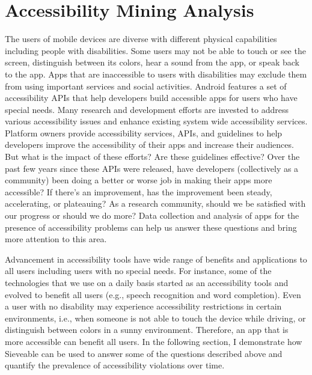 \section{Accessibility Mining Analysis}
The users of mobile devices are diverse with different physical capabilities including people with disabilities.
Some users may not be able to touch or see the screen, distinguish between its colors, hear a sound from the app, or speak back to the app.
Apps that are inaccessible to users with disabilities may exclude them from using important services and social activities.
Android features a set of accessibility APIs that help developers build accessible apps for users who have special needs.
Many research and development efforts are invested to address various accessibility issues and enhance existing system wide accessibility services.
Platform owners provide accessibility services, APIs, and guidelines to help developers improve the accessibility of their apps and increase their audiences.
But what is the impact of these efforts?
Are these guidelines effective?
Over the past few years since these APIs were released, have developers (collectively as a community) been doing a better or worse job in making their apps more accessible?
If there's an improvement, has the improvement been steady, accelerating, or plateauing?
As a research community, should we be satisfied with our progress or should we do more?
Data collection and analysis of apps for the presence of accessibility problems can help us answer these questions and bring more attention to this area.

Advancement in accessibility tools have wide range of benefits and applications to all users including users with no special needs.
For instance, some of the technologies that we use on a daily basis started as an accessibility tools and evolved to benefit all users (e.g., speech recognition and word completion).
Even a user with no disability may experience accessibility restrictions in certain environments, i.e., when someone is not able to touch the device while driving, or distinguish between colors in a sunny environment.
Therefore, an app that is more accessible can benefit all users.
In the following section, I demonstrate how Sieveable can be used to answer some of the questions described above and quantify the prevalence of accessibility violations over time.

